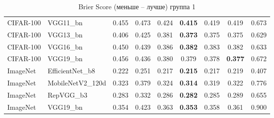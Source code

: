 \begin{table}[h!]
{\begin{tabular}{llccccccc}
CIFAR-100 &          VGG11\_bn &                  0.455 &        0.473 &                  0.424 & \textbf{0.415} &     0.419 &                  0.419 &       0.673 \\
CIFAR-100 &          VGG13\_bn &                  0.406 &        0.425 &                  0.381 & \textbf{0.373} &     0.375 &                  0.375 &       0.629 \\
CIFAR-100 &          VGG16\_bn &                  0.450 &        0.439 &                  0.386 & \textbf{0.382} &     0.383 &                  0.382 &       0.633 \\
CIFAR-100 &          VGG19\_bn &                  0.456 &        0.436 &                  0.380 &                  0.379 &     0.378 & \textbf{0.377} &       0.672 \\
 ImageNet &   EfficientNet\_b8 &                  0.222 &        0.251 &                  0.217 & \textbf{0.215} &     0.217 &                  0.219 &       0.407 \\
 ImageNet &  MobileNetV2\_120d &                  0.323 &        0.379 &                  0.324 & \textbf{0.314} &     0.319 &                  0.322 &       0.776 \\
 ImageNet &         RepVGG\_b3 &                  0.283 &        0.332 &                  0.286 & \textbf{0.282} &     0.285 &                  0.289 &       0.655 \\
 ImageNet &          VGG19\_bn &                  0.354 &        0.423 &                  0.363 & \textbf{0.353} &     0.358 &                  0.361 &       0.900 \\
\bottomrule
\end{tabular}%
}
\caption{Brier Score (меньше -- лучше) группа 1}
\label{tab:metrics:BS_1}
\end{table}
